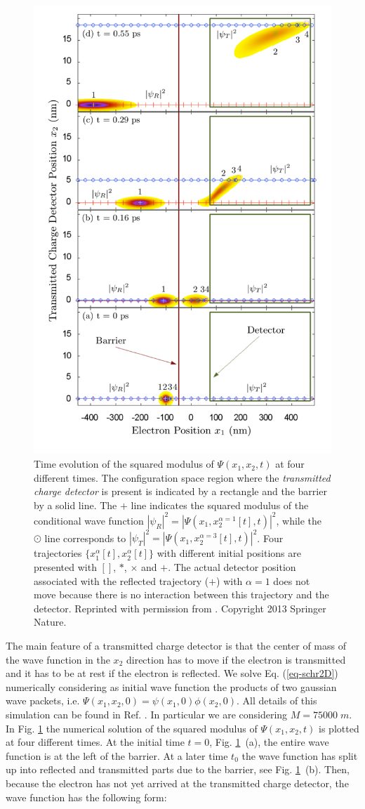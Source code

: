 \documentclass[nofootinbib, secnumarabic, amsmath, nobibnotes,10pt,aps,pra]{revtex4-1}
\newcommand{\fref}[1]{Fig. \ref{#1}}
\newcommand{\eref}[1]{Eq. (\ref{#1})}
\begin{document}
\begin{figure}
\centering
\includegraphics[width=0.57\columnwidth]{F1_12.pdf}
\caption{Time evolution of the squared modulus of $\Psi(x_1,x_2,t)$ at four different times. The configuration space region where the \emph{transmitted charge detector} is present is indicated by a rectangle and the barrier by a solid line. The $+$ line indicates the squared modulus of the conditional wave function $|\psi_R|^2=|\Psi(x_1,x_2^{\alpha=1}[t],t)|^2$, while the  $\odot$ line corresponds to $|\psi_T|^2=|\Psi(x_1,x_2^{\alpha=3}[t],t)|^2$. Four trajectories $\{x_1^\alpha[t],x_2^\alpha[t]\}$ with different initial positions are presented with $[]$, $*$, $\times$ and $+$. The actual detector position associated with the reflected trajectory ($+$) with $\alpha=1$ does not move because there is no interaction between this trajectory and the detector. Reprinted with permission from \cite{om.albareda}. Copyright 2013 Springer Nature.}
\label{conditional wave function-figure1}
\end{figure}

The main feature of a transmitted charge detector is that the center of mass of the wave function in the $x_2$ direction has to move if the
electron is transmitted and it has to be at rest if the electron is reflected.  We solve \eref{eq-schr2D} numerically considering as initial wave function the products of two gaussian wave packets, i.e. $\Psi(x_1,x_2,0) = \psi(x_1,0)\phi(x_2,0)$. All details of this simulation can be found in Ref. \cite{om.albareda,om.2marian}. In particular we are considering $M=75000 \; m$. In \fref{conditional wave function-figure1} the numerical solution of the squared modulus of $\Psi(x_1,x_2,t)$ is plotted at four different times. At the initial time $t = 0$,  \fref{conditional wave function-figure1}~(a),  the entire wave function is at the left of the barrier.  At a later time $t_0$ the wave function has split up into reflected and transmitted parts due to the barrier, see \fref{conditional wave function-figure1}~(b).  Then, because the electron has not yet arrived at the transmitted charge detector, the wave function has the following form: 
\end{document}
